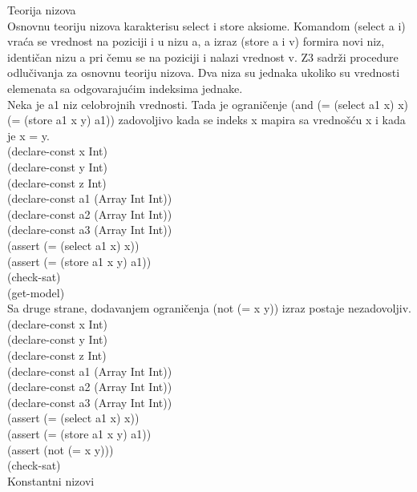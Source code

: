 \documentclass[12pt,oneside]{memoir}
\begin{document}
Teorija nizova\\
Osnovnu teoriju nizova karakterisu select i store aksiome. 
Komandom (select a i) vraća se vrednost na poziciji i u nizu a, a izraz (store a i v) formira novi niz, identičan nizu a pri čemu se na poziciji i nalazi vrednost v.
Z3 sadrži procedure odlučivanja za osnovnu teoriju nizova.
Dva niza su jednaka ukoliko su vrednosti elemenata sa odgovarajućim indeksima jednake.
\\

Neka je a1 niz celobrojnih vrednosti. Tada je ograničenje 
(and (= (select a1 x) x) (= (store a1 x y) a1)) zadovoljivo kada se indeks x mapira sa vrednošću x i kada je x = y.
\\(declare-const x Int)
\\(declare-const y Int)
\\(declare-const z Int)
\\(declare-const a1 (Array Int Int))
\\(declare-const a2 (Array Int Int))
\\(declare-const a3 (Array Int Int))
\\(assert (= (select a1 x) x))
\\(assert (= (store a1 x y) a1))
\\(check-sat)
\\(get-model)
\\
Sa druge strane, dodavanjem ograničenja (not (= x y)) izraz postaje nezadovoljiv.
\\(declare-const x Int)
\\(declare-const y Int)
\\(declare-const z Int)
\\(declare-const a1 (Array Int Int))
\\(declare-const a2 (Array Int Int))
\\(declare-const a3 (Array Int Int))
\\(assert (= (select a1 x) x))
\\(assert (= (store a1 x y) a1))
\\(assert (not (= x y)))
\\(check-sat)
\\
Konstantni nizovi
\\
\end{document}
